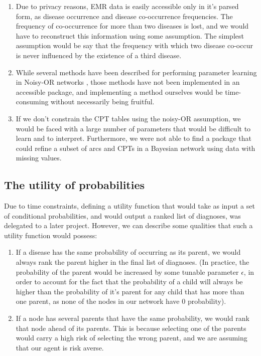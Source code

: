 \documentclass[11pt]{article}
\begin{document}
\begin{enumerate}
\item  Due to privacy reasons, EMR data is easily accessible only in it's parsed form, as disease occurrence and disease co-occurrence frequencies. The frequency of co-occurrence for more than two diseases is lost, and we would have to reconstruct this information using some assumption. The simplest assumption would be say that the frequency with which two disease co-occur is never influenced by the existence of a third disease.

\item While several methods have been described for performing parameter learning in Noisy-OR networks \cite{Halpern,Jernite2013}, those methods have not been implemented in an accessible package, and implementing a method ourselves would be time-consuming without necessarily being fruitful. 

\item If we don't constrain the CPT tables using the noisy-OR assumption, we would be faced with a large number of parameters that would be difficult to learn and to interpret. Furthermore, we were not able to find a package that could refine a subset of arcs and CPTs in a Bayesian network using data with missing values.
\end{enumerate}




\subsection{The utility of probabilities}

Due to time constraints, defining a utility function that would take as input a set of conditional probabilities, and would output a ranked list of diagnoses, was delegated to a later project. However, we can describe some qualities that such a utility function would possess:

\begin{enumerate}
\item  If a disease has the same probability of occurring as its parent, we would always rank the parent higher in the final list of diagnoses. (In practice, the probability of the parent would be increased by some tunable parameter $\epsilon$, in order to account for the fact that the probability of a child will always be higher than the probability of it's parent for any child that has more than one parent, as none of the nodes in our network have 0 probability).

\item If a node has several parents that have the same probability, we would rank that node ahead of its parents. This is because selecting one of the parents would carry a high risk of selecting the wrong parent, and we are assuming that our agent is risk averse.
\end{enumerate}
\end{document}
